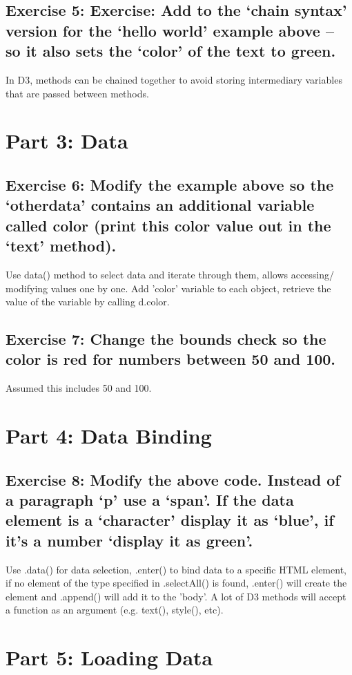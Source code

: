 \documentclass[11pt]{article}   	%
\begin{document}
\subsection{Exercise 5: Exercise: Add to the ‘chain syntax’ version for the ‘hello world’ example above – so it also sets the ‘color’ of the text to green.}
In D3, methods can be chained together to avoid storing intermediary variables that are passed between methods. 



\section{Part 3: Data}
\subsection{Exercise 6: Modify the example above so the ‘otherdata’ contains an additional variable called color (print this color value out in the ‘text’ method).}
Use data() method to select data and iterate through them, allows accessing/ modifying values one by one. Add 'color' variable to each object, retrieve the value of the variable by calling d.color.

\subsection{Exercise 7: Change the bounds check so the color is red for numbers between 50 and 100.}
Assumed this includes 50 and 100.

\section{Part 4: Data Binding}
\subsection{Exercise 8: Modify the above code. Instead of a paragraph ‘p’ use a ‘span’. If the data element is a ‘character’ display it as ‘blue’, if it’s a number ‘display it as green’.}
Use .data() for data selection, .enter() to bind data to a specific HTML element, if no element of the type specified in .selectAll() is found, .enter() will create the element and .append() will add it to the 'body'. \linebreak
A lot of D3 methods will accept a function as an argument (e.g. text(), style(), etc).


\section{Part 5: Loading Data}
\end{document}
